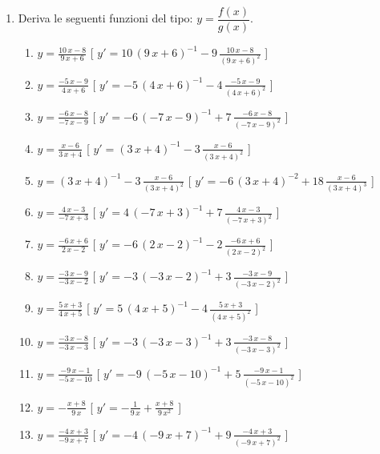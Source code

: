 \begin{enumerate}
\item Deriva le seguenti funzioni del tipo: $y=\dfrac{f(x)}{g(x)}$.

\begin{enumerate}
\item $y= {\frac {10\,x-8}{9\,x+6}} $ \hfill [ $y'= 10\, \left( 9\,x+6 \right) 
^{-1}-9\,{\frac {10\,x-8}{ \left( 9\,x+6 \right) ^{2}}}$ ]
\item $y= {\frac {-5\,x-9}{4\,x+6}} $ \hfill [ $y'= -5\, \left( 4\,x+6 \right) 
^{-1}-4\,{\frac {-5\,x-9}{ \left( 4\,x+6 \right) ^{2}}}$ ]
\item $y= {\frac {-6\,x-8}{-7\,x-9}} $ \hfill [ $y'= -6\, \left( -7\,x-9 \right) 
^{-1}+7\,{\frac {-6\,x-8}{ \left( -7\,x-9 \right) ^{2}}}$ ]
\item $y= {\frac {x-6}{3\,x+4}} $ \hfill [ $y'=  \left( 3\,x+4 \right) 
^{-1}-3\,{\frac {x-6}{ \left( 3\,x+4 \right) ^{2}}}$ ]
\item $y=  \left( 3\,x+4 \right) ^{-1}-3\,{\frac {x-6}{ \left( 3\,x+4 \right) 
^{2}}} $ \hfill [ $y'= -6\, \left( 3\,x+4 \right) ^{-2}+18\,{\frac {x-6}{ \left( 
3\,x+4 \right) ^{3}}}$ ]
\item $y= {\frac {4\,x-3}{-7\,x+3}} $ \hfill [ $y'= 4\, \left( -7\,x+3 \right) 
^{-1}+7\,{\frac {4\,x-3}{ \left( -7\,x+3 \right) ^{2}}}$ ]
\item $y= {\frac {-6\,x+6}{2\,x-2}} $ \hfill [ $y'= -6\, \left( 2\,x-2 \right) 
^{-1}-2\,{\frac {-6\,x+6}{ \left( 2\,x-2 \right) ^{2}}}$ ]
\item $y= {\frac {-3\,x-9}{-3\,x-2}} $ \hfill [ $y'= -3\, \left( -3\,x-2 \right) 
^{-1}+3\,{\frac {-3\,x-9}{ \left( -3\,x-2 \right) ^{2}}}$ ]
\item $y= {\frac {5\,x+3}{4\,x+5}} $ \hfill [ $y'= 5\, \left( 4\,x+5 \right) 
^{-1}-4\,{\frac {5\,x+3}{ \left( 4\,x+5 \right) ^{2}}}$ ]
\item $y= {\frac {-3\,x-8}{-3\,x-3}} $ \hfill [ $y'= -3\, \left( -3\,x-3 \right) 
^{-1}+3\,{\frac {-3\,x-8}{ \left( -3\,x-3 \right) ^{2}}}$ ]
\item $y= {\frac {-9\,x-1}{-5\,x-10}} $ \hfill [ $y'= -9\, \left( -5\,x-10 
\right) ^{-1}+5\,{\frac {-9\,x-1}{ \left( -5\,x-10 \right) ^{2}}}$ ]
\item $y= -{\frac {x+8}{9\,x}} $ \hfill [ $y'= -{\frac {1}{9\,x}}+{\frac 
{x+8}{9\,{x}^{2}}}$ ]
\item $y= {\frac {-4\,x+3}{-9\,x+7}} $ \hfill [ $y'= -4\, \left( -9\,x+7 \right) 
^{-1}+9\,{\frac {-4\,x+3}{ \left( -9\,x+7 \right) ^{2}}}$ ]
\end{enumerate}



\end{enumerate}

